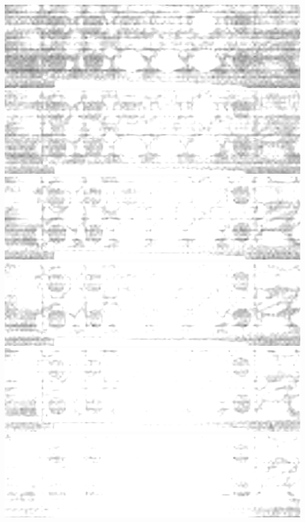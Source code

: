\documentclass{beamer}
\begin{document}
\begin{frame}
        \includegraphics[height=0.023\textheight]{spatial-denoised/wavelet_den_31.png}
        \includegraphics[height=0.023\textheight]{spatial-denoised/wavelet_den_32.png}
        \includegraphics[height=0.023\textheight]{spatial-denoised/wavelet_den_33.png}
        \includegraphics[height=0.023\textheight]{spatial-denoised/wavelet_den_34.png}
        \includegraphics[height=0.023\textheight]{spatial-denoised/wavelet_den_35.png}
        \includegraphics[height=0.023\textheight]{spatial-denoised/wavelet_den_36.png}

\end{frame}
\end{document}
